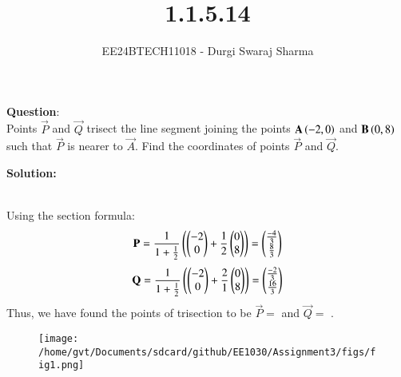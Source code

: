 \documentclass[journal]{IEEEtran}
\begin{document}

\vspace{3cm}

\title{1.1.5.14}
\author{EE24BTECH11018 - Durgi Swaraj Sharma
}
{\let\newpage\relax\maketitle}

\renewcommand{\thefigure}{\theenumi}
\renewcommand{\thetable}{\theenumi}
\setlength{\intextsep}{10pt} %


\renewcommand{\thetable}{\theenumi}


 \textbf{Question}:\\
Points $\vec{P}$ and $\vec{Q}$ trisect the line segment joining the points $\mathbf{A}\left(-2, 0\right)$ and $\mathbf{B}\left(0, 8\right)$ such that $\vec{P}$ is nearer to $\vec{A}$. Find the coordinates of points $\vec{P}$ and $\vec{Q}$. \hfill {}

\textbf{Solution: }\\
    \begin{table}[h!]    
      \centering
      
      \caption{}
    \end{table}\\
 Using the section formula:
\begin{align}
	\mathbf{P} = \frac{1}{1+{\frac{1}{2}}}\left(\begin{pmatrix}-2 \\ 0\end{pmatrix}+\frac{1}{2}\begin{pmatrix}0 \\ 8\end{pmatrix}\right)=\begin{pmatrix}\frac{-4}{3} \\ \frac{8}{3}\end{pmatrix} \label{eq1.1.5.14.1}
\end{align}
\begin{align}
	\mathbf{Q} = \frac{1}{1+{\frac{1}{2}}}\left(\begin{pmatrix}-2 \\ 0\end{pmatrix}+\frac{2}{1}\begin{pmatrix}0 \\ 8\end{pmatrix}\right)=\begin{pmatrix}\frac{-2}{3} \\ \frac{16}{3}\end{pmatrix} \label{eq1.1.5.14.2}
\end{align}
Thus, we have found the points of trisection to be $\vec{P} =$  and $\vec{Q} =$ . 
    \begin{figure}[h]
        \centering
       \texttt{[image: /home/gvt/Documents/sdcard/github/EE1030/Assignment3/figs/fig1.png]}
       \caption{}
       \label{graph}
    \end{figure}
\end{document}
